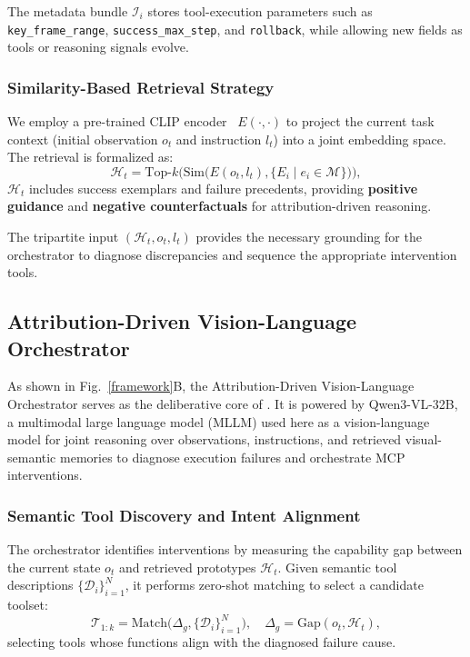 The metadata bundle $\mathcal{I}_i$ stores tool-execution parameters such as \texttt{key\_frame\_range}, \texttt{success\_max\_step}, and \texttt{rollback}, while allowing new fields as tools or reasoning signals evolve.


\subsubsection{Similarity-Based Retrieval Strategy}

We employ a pre-trained CLIP encoder~\cite{CLIP} $E(\cdot, \cdot)$ to project the current task context (initial observation $o_t$ and instruction $l_t$) into a joint embedding space.
The retrieval is formalized as:
\begin{equation}
\mathcal{H}_t = \text{Top-}k\Big(\text{Sim}\big(E(o_t, l_t), \{E_i \mid e_i \in \mathcal{M}\}\big)\Big),
\end{equation}
$\mathcal{H}_t$ includes success exemplars and failure precedents, providing \textbf{positive guidance} and \textbf{negative counterfactuals} for attribution-driven reasoning.

The tripartite input $(\mathcal{H}_t, o_t, l_t)$ provides the necessary grounding for the {\color{black}orchestrator} to diagnose discrepancies and sequence the appropriate intervention tools.
\vspace{-0.5em}
\subsection{\texorpdfstring{{\color{black}Attribution-Driven Vision-Language Orchestrator}}{Attribution-Driven Vision-Language Orchestrator}}

{\color{black}As shown in Fig.~\ref{framework}B, the Attribution-Driven Vision-Language Orchestrator serves as the deliberative core of {\sys}. It is powered by Qwen3-VL-32B, a multimodal large language model (MLLM) used here as a vision-language model for joint reasoning over observations, instructions, and retrieved visual-semantic memories to diagnose execution failures and orchestrate MCP interventions.}


\subsubsection{Semantic Tool Discovery and Intent Alignment}

The {\color{black}orchestrator} identifies interventions by measuring the capability gap between the current state $o_t$ and retrieved prototypes $\mathcal{H}_t$.
Given semantic tool descriptions $\{\mathcal{D}_i\}_{i=1}^N$, it performs zero-shot matching to select a candidate toolset:
\begin{equation}
    \mathcal{T}_{1:k}= \text{Match}\big(\Delta_{g}, \{\mathcal{D}_i\}_{i=1}^N\big), \quad \Delta_{g} = \text{Gap}(o_t, \mathcal{H}_t),
\end{equation}
selecting tools whose functions align with the diagnosed failure cause.

